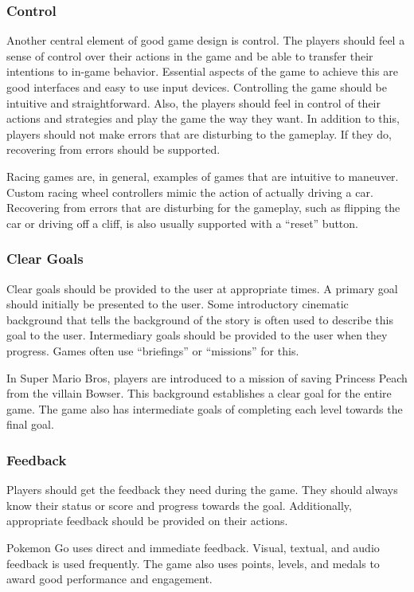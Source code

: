 \documentclass[../Main.tex]{subfiles}
\begin{document}
\subsubsection{Control}
Another central element of good game design is control. The players should feel a sense of control over their actions in the game and be able to transfer their intentions to in-game behavior. Essential aspects of the game to achieve this are good interfaces and easy to use input devices. Controlling the game should be intuitive and straightforward. Also, the players should feel in control of their actions and strategies and play the game the way they want. In addition to this, players should not make errors that are disturbing to the gameplay. If they do, recovering from errors should be supported. 

Racing games are, in general, examples of games that are intuitive to maneuver. Custom racing wheel controllers mimic the action of actually driving a car. Recovering from errors that are disturbing for the gameplay, such as flipping the car or driving off a cliff, is also usually supported with a “reset” button.

\subsubsection{Clear Goals}
Clear goals should be provided to the user at appropriate times. A primary goal should initially be presented to the user. Some introductory cinematic background that tells the background of the story is often used to describe this goal to the user. Intermediary goals should be provided to the user when they progress. Games often use “briefings” or “missions” for this. 

In Super Mario Bros, players are introduced to a mission of saving Princess Peach from the villain Bowser. This background establishes a clear goal for the entire game. The game also has intermediate goals of completing each level towards the final goal.

\subsubsection{Feedback}
Players should get the feedback they need during the game. They should always know their status or score and progress towards the goal. Additionally, appropriate feedback should be provided on their actions. 

Pokemon Go uses direct and immediate feedback. Visual, textual, and audio feedback is used frequently. The game also uses points, levels, and medals to award good performance and engagement.
\end{document}
